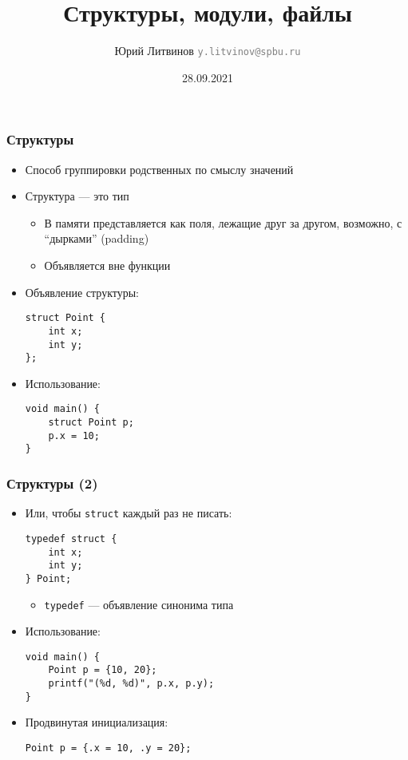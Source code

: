 \documentclass[xetex,mathserif,serif]{beamer}
\title{Структуры, модули, файлы}
\author[Юрий Литвинов]{Юрий Литвинов \newline \textcolor{gray}{\small\texttt{y.litvinov@spbu.ru}}}
\date{28.09.2021}
\begin{document}
    
    \frame{\titlepage}
    
    \begin{frame}[fragile]
        \frametitle{Структуры}
        \begin{itemize}
            \item Способ группировки родственных по смыслу значений
            \item Структура --- это тип
            \begin{itemize}
                \item В памяти представляется как поля, лежащие друг за другом, возможно, с ``дырками'' (padding)
                \item Объявляется вне функции
            \end{itemize}
            \item Объявление структуры:
            \begin{verbatim}
struct Point {
    int x;
    int y;
};
            \end{verbatim}
            \item Использование:
            \begin{verbatim}
void main() {
    struct Point p;
    p.x = 10;
}
            \end{verbatim}
        \end{itemize}
    \end{frame}

    \begin{frame}[fragile]
        \frametitle{Структуры (2)}
        \begin{itemize}
            \item Или, чтобы \texttt{struct} каждый раз не писать:
            \begin{verbatim}
typedef struct {
    int x;
    int y;
} Point;
            \end{verbatim}
            \begin{itemize}
                \item \texttt{typedef} --- объявление синонима типа
            \end{itemize}
            \item Использование:
            \begin{verbatim}
void main() {
    Point p = {10, 20};
    printf("(%d, %d)", p.x, p.y);
}
            \end{verbatim}
            \item Продвинутая инициализация:
            \begin{verbatim}
Point p = {.x = 10, .y = 20};
            \end{verbatim}
        \end{itemize}
    \end{frame}
\end{document}
